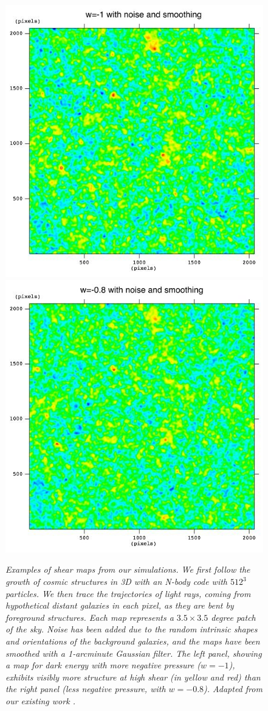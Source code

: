 \documentclass[10pt, preprint]{aastex}
\begin{document}
\begin{figure}[t]
\begin{center}
\includegraphics[width=8 cm]{fig1c.jpg} \includegraphics[width=8 cm]{fig1d.jpg}
\vspace{-1.5\baselineskip} \caption{\textit{Examples of shear maps
    from our simulations. We first follow the growth of cosmic
    structures in 3D with an N-body code with $512^3$ particles. We
    then trace the trajectories of light rays, coming from
    hypothetical distant galaxies in each pixel, as they are bent by
    foreground structures.  Each map represents a $3.5\times3.5$
    degree patch of the sky.  Noise has been added due to the random
    intrinsic shapes and orientations of the background galaxies, and
    the maps have been smoothed with a 1-arcminute Gaussian filter.
    The left panel, showing a map for dark energy with more negative
    pressure ($w=-1$), exhibits visibly more structure at high shear
    (in yellow and red) than the right panel (less negative pressure,
    with $w=-0.8$).  Adapted from our existing work \citep{KHM09}. }}
\end{center}
\vspace{-1\baselineskip}
\end{figure}
\end{document}
